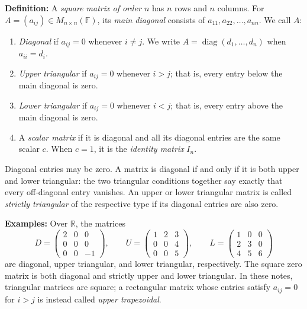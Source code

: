 \documentclass[a4paper,11pt,abstract=true]{scrartcl}
\theoremstyle{dotlessP}
\theoremstyle{dotlessS}
\theoremstyle{remark}
\theoremstyle{definition}
\begin{document}
\begin{claim_box}
\textbf{Definition:}
A \emph{square matrix of order $n$} has $n$ rows and $n$ columns.
For $A=(a_{ij})\in M_{n\times n}(\mathbb{F})$, its \emph{main diagonal}
consists of $a_{11},a_{22},\ldots,a_{nn}$. We call $A$:
\begin{enumerate}
    \item \emph{Diagonal} if $a_{ij}=0$ whenever $i\neq j$.
    We write $A=\operatorname{diag}(d_1,\ldots,d_n)$ when $a_{ii}=d_i$.
    \item \emph{Upper triangular} if $a_{ij}=0$ whenever $i>j$;
    that is, every entry below the main diagonal is zero.
    \item \emph{Lower triangular} if $a_{ij}=0$ whenever $i<j$;
    that is, every entry above the main diagonal is zero.
    \item A \emph{scalar matrix} if it is diagonal and all its
    diagonal entries are the same scalar $c$. When $c=1$, it is the
    \emph{identity matrix} $I_n$.
\end{enumerate}
Diagonal entries may be zero. A matrix is diagonal if and only if it is
both upper and lower triangular: the two triangular conditions together
say exactly that every off-diagonal entry vanishes. An upper or lower
triangular matrix is called \emph{strictly triangular} of the respective
type if its diagonal entries are also zero.
\end{claim_box}

\begin{example_box}
\textbf{Examples:} Over $\mathbb{R}$, the matrices
\[
D=\begin{pmatrix}2&0&0\\0&0&0\\0&0&-1\end{pmatrix},\qquad
U=\begin{pmatrix}1&2&3\\0&0&4\\0&0&5\end{pmatrix},\qquad
L=\begin{pmatrix}1&0&0\\2&3&0\\4&5&6\end{pmatrix}
\]
are diagonal, upper triangular, and lower triangular, respectively.
The square zero matrix is both diagonal and strictly upper and lower
triangular. In these notes, triangular matrices are square; a rectangular
matrix whose entries satisfy $a_{ij}=0$ for $i>j$ is instead called
\emph{upper trapezoidal}.
\end{example_box}
\end{document}

